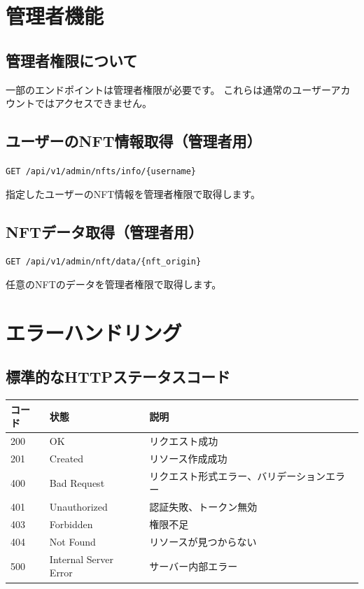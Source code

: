 \documentclass[11pt,a4paper]{ltjsarticle}  %
\begin{document}
\section{管理者機能}

\subsection{管理者権限について}
一部のエンドポイントは管理者権限が必要です。
これらは通常のユーザーアカウントではアクセスできません。

\subsection{ユーザーのNFT情報取得（管理者用）}

\begin{tcolorbox}[colback=blue!5,colframe=blue!50!black,title=エンドポイント]
\texttt{GET /api/v1/admin/nfts/info/\{username\}}
\end{tcolorbox}

指定したユーザーのNFT情報を管理者権限で取得します。

\subsection{NFTデータ取得（管理者用）}

\begin{tcolorbox}[colback=blue!5,colframe=blue!50!black,title=エンドポイント]
\texttt{GET /api/v1/admin/nft/data/\{nft\_origin\}}
\end{tcolorbox}

任意のNFTのデータを管理者権限で取得します。

\section{エラーハンドリング}

\subsection{標準的なHTTPステータスコード}

\begin{longtable}{|l|l|p{8cm}|}
\hline
\textbf{コード} & \textbf{状態} & \textbf{説明} \\
\hline
\endhead
200 & OK & リクエスト成功 \\
\hline
201 & Created & リソース作成成功 \\
\hline
400 & Bad Request & リクエスト形式エラー、バリデーションエラー \\
\hline
401 & Unauthorized & 認証失敗、トークン無効 \\
\hline
403 & Forbidden & 権限不足 \\
\hline
404 & Not Found & リソースが見つからない \\
\hline
500 & Internal Server Error & サーバー内部エラー \\
\hline
\end{longtable}
\end{document}
